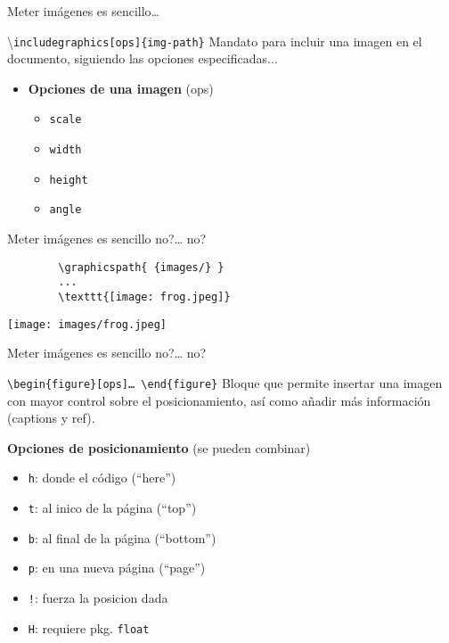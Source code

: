 \begin{frame}{Meter imágenes es sencillo\ldots{}}
    \begin{block}{\textbackslash \texttt{includegraphics[ops]\{img-path\}}}
    Mandato para incluir una imagen en el documento, siguiendo las opciones especificadas...
    
    \begin{itemize}
        \item \textbf{Opciones de una imagen} (ops)
        \begin{itemize}
            \item \texttt{scale}
            \item \texttt{width}
            \item \texttt{height}
            \item \texttt{angle}
        \end{itemize}
    \end{itemize}        
    
    \end{block}    

\end{frame}

\begin{frame}[fragile]{Meter imágenes es sencillo no?\ldots{} no?}

{\small
    \begin{verbatim}
        \graphicspath{ {images/} }
        ...
        \texttt{[image: frog.jpeg]}
    \end{verbatim}
}
    \vspace{1cm}
    \pause
    \begin{center}
        \texttt{[image: images/frog.jpeg]}
    \end{center}
\end{frame}


\begin{frame}[fragile]{Meter imágenes es sencillo no?\ldots{} no?}
    \begin{block}{\texttt{\textbackslash begin\{figure\}[ops]\ldots{} \textbackslash end\{figure\}}}
    Bloque que permite insertar una imagen con mayor control sobre el posicionamiento, así como añadir más información (captions y ref).    
    \end{block}
    \textbf{Opciones de posicionamiento} (se pueden combinar)
    \begin{itemize}
        \item \texttt{h}: donde el código (``here'')
        \item \texttt{t}: al inico de la página (``top'')
        \item \texttt{b}: al final de la página (``bottom'')
        \item \texttt{p}: en una nueva página (``page'')
        \item \texttt{!}: fuerza la posicion dada
        \item \texttt{H}: requiere pkg. \texttt{float}
    \end{itemize}
    
\end{frame}


